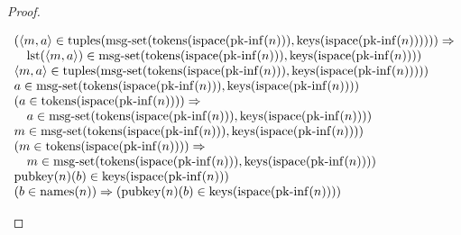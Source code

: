 \documentclass[11pt]{article}
\theoremstyle{plain}
\begin{document}
\begin{proof}
\begin{itemize}[leftmargin=2.8em, itemsep=4pt, parsep=1pt]
\begin{itemize}[leftmargin=2.8em, itemsep=4pt, parsep=1pt]
\begin{equation*}
\begin{array}{@{}l@{}}
\begin{array}{@{}l@{}} (\langle m, a \rangle \in \operatorname{tuples}(\operatorname{msg\text{-}set}(\operatorname{tokens}(\operatorname{ispace}(\operatorname{pk\text{-}inf}(n))), \operatorname{keys}(\operatorname{ispace}(\operatorname{pk\text{-}inf}(n)))))) \Rightarrow  \\ \quad \operatorname{lst}(\langle m, a \rangle) \in \operatorname{msg\text{-}set}(\operatorname{tokens}(\operatorname{ispace}(\operatorname{pk\text{-}inf}(n))), \operatorname{keys}(\operatorname{ispace}(\operatorname{pk\text{-}inf}(n)))) \end{array} \\
\langle m, a \rangle \in \operatorname{tuples}(\operatorname{msg\text{-}set}(\operatorname{tokens}(\operatorname{ispace}(\operatorname{pk\text{-}inf}(n))), \operatorname{keys}(\operatorname{ispace}(\operatorname{pk\text{-}inf}(n))))) \\
a \in \operatorname{msg\text{-}set}(\operatorname{tokens}(\operatorname{ispace}(\operatorname{pk\text{-}inf}(n))), \operatorname{keys}(\operatorname{ispace}(\operatorname{pk\text{-}inf}(n)))) \\
\begin{array}{@{}l@{}} (a \in \operatorname{tokens}(\operatorname{ispace}(\operatorname{pk\text{-}inf}(n)))) \Rightarrow  \\ \quad a \in \operatorname{msg\text{-}set}(\operatorname{tokens}(\operatorname{ispace}(\operatorname{pk\text{-}inf}(n))), \operatorname{keys}(\operatorname{ispace}(\operatorname{pk\text{-}inf}(n)))) \end{array} \\
m \in \operatorname{msg\text{-}set}(\operatorname{tokens}(\operatorname{ispace}(\operatorname{pk\text{-}inf}(n))), \operatorname{keys}(\operatorname{ispace}(\operatorname{pk\text{-}inf}(n)))) \\
\begin{array}{@{}l@{}} (m \in \operatorname{tokens}(\operatorname{ispace}(\operatorname{pk\text{-}inf}(n)))) \Rightarrow  \\ \quad m \in \operatorname{msg\text{-}set}(\operatorname{tokens}(\operatorname{ispace}(\operatorname{pk\text{-}inf}(n))), \operatorname{keys}(\operatorname{ispace}(\operatorname{pk\text{-}inf}(n)))) \end{array} \\
\operatorname{pubkey}(n)(b) \in \operatorname{keys}(\operatorname{ispace}(\operatorname{pk\text{-}inf}(n))) \\
(b \in \operatorname{names}(n)) \Rightarrow (\operatorname{pubkey}(n)(b) \in \operatorname{keys}(\operatorname{ispace}(\operatorname{pk\text{-}inf}(n)))) \\

\end{array}
\end{equation*}
\end{itemize}
\end{itemize}
\end{proof}
\end{document}
